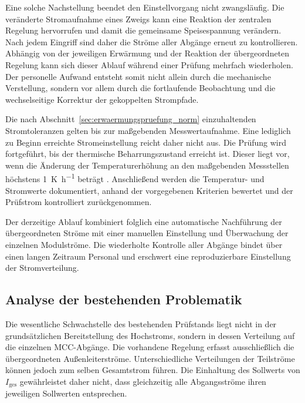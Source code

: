 Eine solche Nachstellung beendet den Einstellvorgang nicht zwangsläufig. Die
veränderte Stromaufnahme eines Zweigs kann eine Reaktion der zentralen
Regelung hervorrufen und damit die gemeinsame Speisespannung verändern. Nach
jedem Eingriff sind daher die Ströme aller Abgänge erneut zu kontrollieren.
Abhängig von der jeweiligen Erwärmung und der Reaktion der übergeordneten
Regelung kann sich dieser Ablauf während einer Prüfung mehrfach wiederholen.
Der personelle Aufwand entsteht somit nicht allein durch die mechanische
Verstellung, sondern vor allem durch die fortlaufende Beobachtung und die
wechselseitige Korrektur der gekoppelten Strompfade.

Die nach Abschnitt~\ref{sec:erwaermungspruefung_norm} einzuhaltenden
Stromtoleranzen gelten bis zur maßgebenden Messwertaufnahme. Eine lediglich
zu Beginn erreichte Stromeinstellung reicht daher nicht aus. Die Prüfung wird
fortgeführt, bis der thermische Beharrungszustand erreicht ist. Dieser liegt
vor, wenn die Änderung der Temperaturerhöhung an den maßgebenden Messstellen
höchstens \SI{1}{\kelvin\per\hour} beträgt
\parencite[Abschn.~10.10.2.3.1]{din_en_61439_1}. Anschließend werden die
Temperatur- und Stromwerte dokumentiert, anhand der vorgegebenen Kriterien
bewertet und der Prüfstrom kontrolliert zurückgenommen.

Der derzeitige Ablauf kombiniert folglich eine automatische Nachführung der
übergeordneten Ströme mit einer manuellen Einstellung und Überwachung der
einzelnen Modulströme. Die wiederholte Kontrolle aller Abgänge bindet über
einen langen Zeitraum Personal und erschwert eine reproduzierbare
Einstellung der Stromverteilung.


\subsection{Analyse der bestehenden Problematik}
\label{sec:analyse_problematik}

Die wesentliche Schwachstelle des bestehenden Prüfstands liegt nicht in der
grundsätzlichen Bereitstellung des Hochstroms, sondern in dessen Verteilung
auf die einzelnen MCC-Abgänge. Die vorhandene Regelung erfasst ausschließlich
die übergeordneten Außenleiterströme. Unterschiedliche Verteilungen der
Teilströme können jedoch zum selben Gesamtstrom führen. Die Einhaltung des
Sollwerts von \(I_\mathrm{ges}\) gewährleistet daher nicht, dass gleichzeitig
alle Abgangsströme ihren jeweiligen Sollwerten entsprechen.

